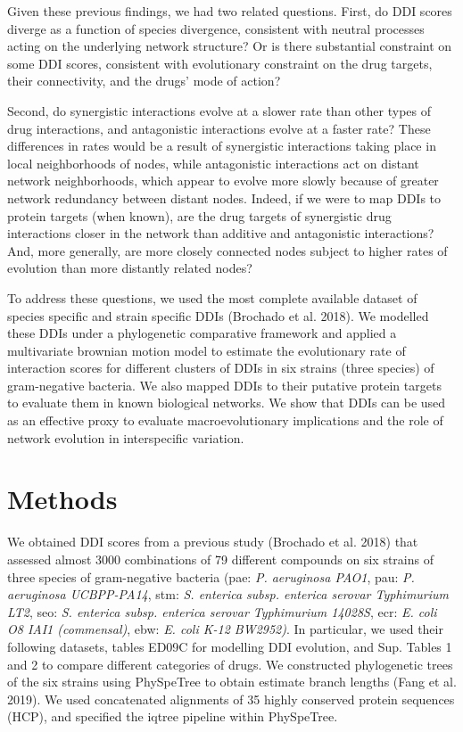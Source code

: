 \documentclass[
]{article}
\begin{document}
Given these previous findings, we had two related questions. First, do DDI scores diverge as a function of species divergence, consistent with neutral processes acting on the underlying network structure? Or is there substantial constraint on some DDI scores, consistent with evolutionary constraint on the drug targets, their connectivity, and the drugs' mode of action?

Second, do synergistic interactions evolve at a slower rate than other types of drug interactions, and antagonistic interactions evolve at a faster rate? These differences in rates would be a result of synergistic interactions taking place in local neighborhoods of nodes, while antagonistic interactions act on distant network neighborhoods, which appear to evolve more slowly because of greater network redundancy between distant nodes. Indeed, if we were to map DDIs to protein targets (when known), are the drug targets of synergistic drug interactions closer in the network than additive and antagonistic interactions? And, more generally, are more closely connected nodes subject to higher rates of evolution than more distantly related nodes?

To address these questions, we used the most complete available dataset of species specific and strain specific DDIs (Brochado et al. 2018). We modelled these DDIs under a phylogenetic comparative framework and applied a multivariate brownian motion model to estimate the evolutionary rate of interaction scores for different clusters of DDIs in six strains (three species) of gram-negative bacteria. We also mapped DDIs to their putative protein targets to evaluate them in known biological networks. We show that DDIs can be used as an effective proxy to evaluate macroevolutionary implications and the role of network evolution in interspecific variation.

\hypertarget{methods}{%
\section{Methods}\label{methods}}

We obtained DDI scores from a previous study (Brochado et al. 2018) that assessed almost 3000 combinations of 79 different compounds on six strains of three species of gram-negative bacteria (pae: \emph{P. aeruginosa PAO1}, pau: \emph{P. aeruginosa UCBPP-PA14}, stm: \emph{S. enterica subsp. enterica serovar Typhimurium LT2}, seo: \emph{S. enterica subsp. enterica serovar Typhimurium 14028S}, ecr: \emph{E. coli O8 IAI1 (commensal)}, ebw: \emph{E. coli K-12 BW2952)}. In particular, we used their following datasets, tables ED09C for modelling DDI evolution, and Sup. Tables 1 and 2 to compare different categories of drugs. We constructed phylogenetic trees of the six strains using PhySpeTree to obtain estimate branch lengths (Fang et al. 2019). We used concatenated alignments of 35 highly conserved protein sequences (HCP), and specified the iqtree pipeline within PhySpeTree.
\end{document}
